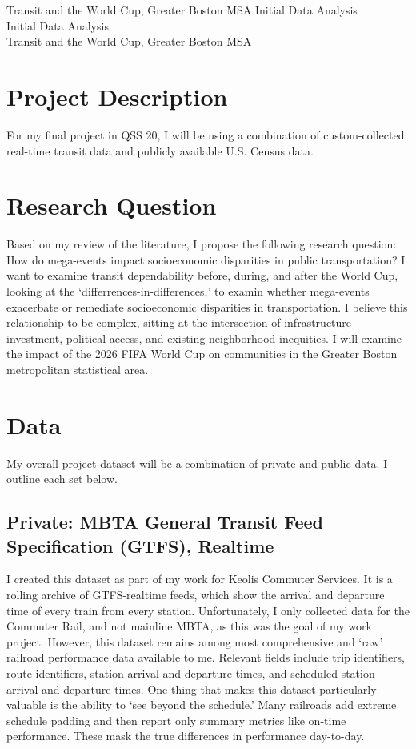 \documentclass[12pt]{article}
\def\assignment{Initial Data Analysis}
\def\byline{Transit and the World Cup, Greater Boston MSA}
\begin{document}
\begingroup
\centering
\ifx\byline\empty
\LARGE\assignment\\
\else\LARGE\assignment\\\large\byline\\[1.5em]
\fi
\endgroup
\section{Project Description}
For my final project in QSS 20, I will be using a combination of custom-collected real-time transit data and publicly available U.S. Census data.

\section{Research Question}
Based on my review of the literature, I propose the following research question:
How do mega-events impact socioeconomic disparities in public transportation?
I want to examine transit dependability before, during, and after the World Cup, looking at the `differrences-in-differences,' to examin whether mega-events exacerbate or remediate socioeconomic disparities in transportation.
I believe this relationship to be complex, sitting at the intersection of infrastructure investment, political access, and existing neighborhood inequities.
I will examine the impact of the 2026 FIFA World Cup on communities in the Greater Boston metropolitan statistical area.

\section{Data}
My overall project dataset will be a combination of private and public data.
I outline each set below.
\subsection{Private: MBTA General Transit Feed Specification (GTFS), Realtime}
I created this dataset as part of my work for Keolis Commuter Services.
It is a rolling archive of GTFS-realtime feeds, which show the arrival and departure time of every train from every station.
Unfortunately, I only collected data for the Commuter Rail, and not mainline MBTA, as this was the goal of my work project.
However, this dataset remains among most comprehensive and `raw' railroad performance data available to me.
Relevant fields include trip identifiers, route identifiers, station arrival and departure times, and scheduled station arrival and departure times.
One thing that makes this dataset particularly valuable is the ability to `see beyond the schedule.'
Many railroads add extreme schedule padding and then report only summary metrics like on-time performance.
These mask the true differences in performance day-to-day.
\end{document}
